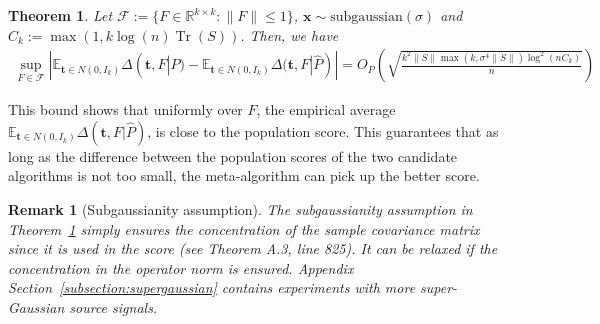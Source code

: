 \documentclass[letterpaper]{article}
\newtheorem{remark}{Remark}
\newtheorem{theorem}{Theorem}
\newcommand{\bas}[1]{\begin{align*}#1\end{align*}}
\newcommand{\bx}{\pmb{x}}
\newcommand{\bt}{\pmb{t}}
\newcommand{\bv}{\pmb{v}}
\newcommand{\rd}{\color{red}}
\newcommand{\bk}{\color{black}}
\newcommand{\E}{\mathbb{E}}
\newcommand{\norm}[1]{\left\|#1\right\|}
\newcommand{\inner}[2]{\langle #1,#2 \rangle}
\newcommand{\bb}[1]{\left(#1\right)}
\DeclareMathOperator{\Tr}{Tr}
\begin{document}
\begin{theorem}
    \label{theorem:uniform_convergence}
    Let $\mathcal{F}:=\{F\in \mathbb{R}^{k\times k}:\|F\|\leq 1\}$, $\bx\sim\text{subgaussian}(\sigma)$ and $C_{k} := \max(1,
k\log\bb{n}\Tr(S))$. Then, we have 
    {\normalsize
    \bas{
    \sup_{F\in\mathcal{F}}|\E_{\bt\in N(0,I_k)}\Delta(\bt,F|P)-\E_{\bt\in N(0,I_k)}\Delta(\bt,F|\hat{P})|=O_P\bb{\sqrt{\frac{k^2\|S\|\max(k,\sigma^{4}\|S\|)\log^2 (n C_k)}{n}}}
    }}
\end{theorem}
This bound shows that uniformly over $F$, the empirical average 
$\E_{\bt\in N(0,I_k)}\Delta(\bt,F|\hat{P})$, is close to the population score. This guarantees that as long as the difference between the population scores of the two candidate algorithms is not too small, the meta-algorithm can pick up the better score.
\begin{remark}[Subgaussianity assumption]
The subgaussianity assumption in Theorem~\ref{theorem:uniform_convergence} simply ensures the concentration of the sample covariance matrix since it is used in the score (see Theorem A.3, line 825). It can be relaxed if the concentration in the operator norm is ensured. Appendix Section~\ref{subsection:supergaussian} contains experiments with more super-Gaussian source signals.
\end{remark}
\end{document}
